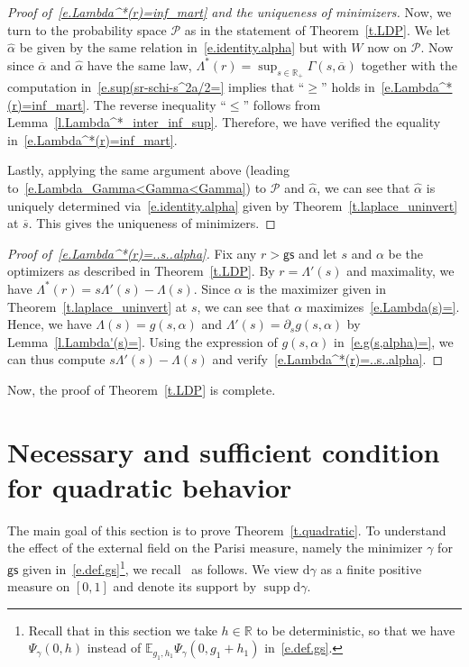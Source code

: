 \documentclass[11pt]{amsart}
\theoremstyle{remark}
\theoremstyle{definition}
\numberwithin{equation}{section}
\numberwithin{proposition}{section}
\numberwithin{figure}{section}
\numberwithin{table}{section}
\newcommand{\R}{\mathbb{R}}
\renewcommand{\leq}{\leqslant}
\renewcommand{\geq}{\geqslant}
\renewcommand{\bar}{\overline}
\renewcommand{\hat}{\widehat}
\newcommand{\1}{\mathbf{1}}
\newcommand{\msf}{\mathsf}
\newcommand{\msc}{\mathscr}
\DeclareMathOperator{\supp}{supp}
\newcommand{\gs}{\msf {gs}}
\begin{document}
\begin{proof}[Proof of~\eqref{e.Lambda^*(r)=inf_mart} and the uniqueness of minimizers]
Now, we turn to the probability space $\msc P$ as in the statement of Theorem~\ref{t.LDP}. We let $\hat \alpha$ be given by the same relation in~\eqref{e.identity.alpha} but with $W$ now on $\msc P$. Now since $\bar \alpha$ and $\hat \alpha$ have the same law, $\Lambda^*(r) =\sup_{s\in\R_+}\Gamma(s,\bar\alpha)$ together with the computation in~\eqref{e.sup(sr-schi-s^2a/2=} implies that ``$\geq $'' holds in~\eqref{e.Lambda^*(r)=inf_mart}. The reverse inequality ``$\leq $'' follows from Lemma~\ref{l.Lambda^*_inter_inf_sup}. Therefore, we have verified the equality in~\eqref{e.Lambda^*(r)=inf_mart}.

Lastly, applying the same argument above (leading to~\eqref{e.Lambda_Gamma<Gamma<Gamma}) to $\msc P$ and $\hat \alpha$, we can see that $\hat\alpha$ is uniquely determined via~\eqref{e.identity.alpha} given by Theorem~\ref{t.laplace_uninvert} at $\bar s$. This gives the uniqueness of minimizers.
\end{proof}


\begin{proof}[Proof of~\eqref{e.Lambda^*(r)=..s..alpha}]
Fix any $r>\gs$ and let $s$ and $\alpha$ be the optimizers as described in Theorem~\ref{t.LDP}. By $r=\Lambda'(s)$ and maximality, we have $\Lambda^*(r)= s\Lambda'(s)-\Lambda(s)$. 
Since $\alpha$ is the maximizer given in Theorem~\ref{t.laplace_uninvert} at $s$, we can see that $\alpha$ maximizes~\eqref{e.Lambda(s)=}.
Hence, we have $\Lambda(s)= g(s,\alpha)$ and $\Lambda'(s)=\partial_sg(s,\alpha)$ by Lemma~\ref{l.Lambda'(s)=}. Using the expression of $g(s,\alpha)$ in~\eqref{e.g(s,alpha)=}, we can thus compute $s\Lambda'(s)-\Lambda(s)$ and verify~\eqref{e.Lambda^*(r)=..s..alpha}.
\end{proof}

Now, the proof of Theorem~\ref{t.LDP} is complete.


\section{Necessary and sufficient condition for quadratic behavior}
\label{s.quadratic}

The main goal of this section is to prove Theorem~\ref{t.quadratic}. 
To understand the effect of the external field on the Parisi measure, namely the minimizer $\gamma$ for $\gs$ given in~\eqref{e.def.gs}\footnote{Recall that in this section we take $h \in \mathbb{R}$ to be deterministic, so that we have $\Psi_\gamma(0,h)$ instead of $\mathbb{E}_{g_1,h_1}\Psi_\gamma(0,g_1 + h_1)$ in~\eqref{e.def.gs}.}, we recall~\cite[Proposition~3]{chen2017fluctuations} as follows. We view $\mathrm{d}\gamma$ as a finite positive measure on $[0,1]$ and denote its support by $\supp \mathrm{d}\gamma$.
\end{document}
